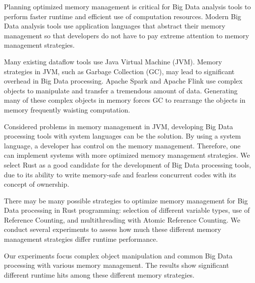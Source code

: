


Planning optimized memory management is critical for Big Data analysis tools to perform faster runtime and efficient use of computation resources.
Modern Big Data analysis tools use application languages that abstract their memory management so that developers do not have to pay extreme attention to memory management strategies.

Many existing dataflow tools use Java Virtual Machine (JVM). 
Memory strategies in JVM, such as Garbage Collection (GC), may lead to significant overhead in Big Data processing. 
Apache Spark and Apache Flink use complex objects to manipulate and transfer a tremendous amount of data. 
Generating many of these complex objects in memory forces GC to rearrange the objects in memory frequently waisting computation. 

Considered problems in memory management in JVM, developing Big Data processing tools with system languages can be the solution.
By using a system language, a developer has control on the memory management. Therefore, one can implement systems with more optimized memory management strategies.
We select Rust as a good candidate for the development of Big Data processing tools, due to its ability to write memory-safe and fearless concurrent codes with its concept of ownership.

There may be many possible strategies to optimize memory management for Big Data processing in Rust programming: 
selection of different variable types, use of Reference Counting, and multithreading with Atomic Reference Counting.
We conduct several experiments to assess how much these different memory management strategies differ runtime performance.

Our experiments focus complex object manipulation and common Big Data processing with various memory management.
The results show significant different runtime hits among these different memory strategies.